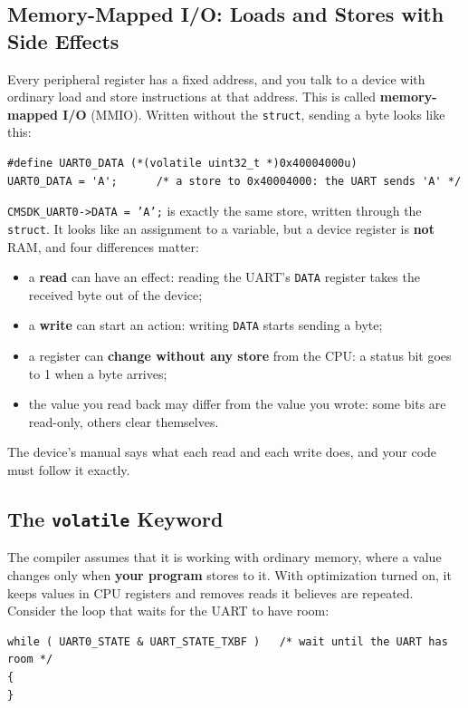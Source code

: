 \subsection{Memory-Mapped I/O: Loads and Stores with Side Effects}
Every peripheral register has a fixed address, and you talk to a device with ordinary load and store instructions at that address. This is called \textbf{memory-mapped I/O} (MMIO). Written without the \texttt{struct}, sending a byte looks like this:

\begin{lstlisting}
#define UART0_DATA (*(volatile uint32_t *)0x40004000u)
UART0_DATA = 'A';      /* a store to 0x40004000: the UART sends 'A' */
\end{lstlisting}

\texttt{CMSDK\_UART0->DATA = 'A';} is exactly the same store, written through the \texttt{struct}. It looks like an assignment to a variable, but a device register is \textbf{not} RAM, and four differences matter:
\begin{itemize}
    \item a \textbf{read} can have an effect: reading the UART's \texttt{DATA} register takes the received byte out of the device;
    \item a \textbf{write} can start an action: writing \texttt{DATA} starts sending a byte;
    \item a register can \textbf{change without any store} from the CPU: a status bit goes to 1 when a byte arrives;
    \item the value you read back may differ from the value you wrote: some bits are read-only, others clear themselves.
\end{itemize}

The device's manual says what each read and each write does, and your code must follow it exactly.

\subsection{The \texttt{volatile} Keyword}
The compiler assumes that it is working with ordinary memory, where a value changes only when \textbf{your program} stores to it. With optimization turned on, it keeps values in CPU registers and removes reads it believes are repeated. Consider the loop that waits for the UART to have room:

\begin{lstlisting}
while ( UART0_STATE & UART_STATE_TXBF )   /* wait until the UART has room */
{
}
\end{lstlisting}

